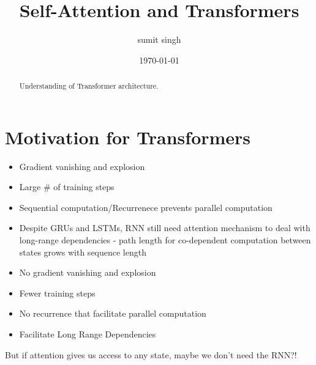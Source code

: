 \documentclass{article}
\title{Self-Attention and Transformers}
\author{sumit singh}
\date{\today}
\begin{document}
\maketitle
\begin{abstract}
\noindent
Understanding of Transformer architecture.

\end{abstract}

\hspace{0.5in}
\section{Motivation for Transformers}
\begin{tcbraster}[raster columns=2,raster equal height,nobeforeafter,raster column skip=0.5cm]
  \begin{tcolorbox}[title=Challenges with RNNs]
    \begin{itemize}
    \item Gradient vanishing and explosion
    \item Large \# of training steps
    \item Sequential computation/Recurrenece prevents parallel computation
    \item Despite GRUs and LSTMs, RNN still need attention mechanism to deal with long-range dependencies - path length for co-dependent computation between states grows with sequence length
\end{itemize}
  \end{tcolorbox}
  \begin{tcolorbox}[title=Transformer Networks]
    \begin{itemize}
    
    \item No gradient vanishing and explosion
    \item Fewer training steps
    \item No recurrence that facilitate parallel computation
    \item Facilitate Long Range Dependencies
\end{itemize}
  \end{tcolorbox}
\end{tcbraster}
But if attention gives us access to any state, maybe we don't need the RNN?!
\end{document}
